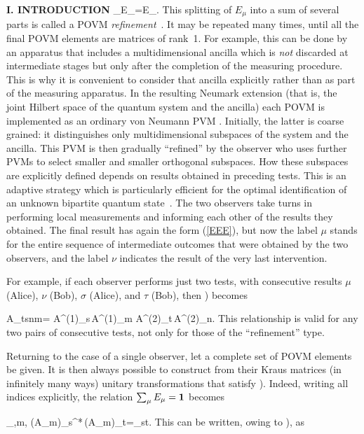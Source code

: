 \begin{center}{\bf I. INTRODUCTION}
\beq \sum_\nu E_{\nu\mu}=E_\mu. \eeq
This splitting of $E_\mu$ into a sum of several parts is called a POVM
{\it refinement\/}~\cite{PW91}. It may be repeated many times, until all
the final POVM elements are matrices of rank~1. For example, this can be
done by an apparatus that includes a multidimensional ancilla which is
{\it not\/} discarded at intermediate stages but only after the
completion of the measuring procedure. This is why it is convenient to
consider that ancilla explicitly rather than as part of the measuring
apparatus. In the resulting Neumark extension (that is, the joint
Hilbert space of the quantum system and the ancilla) each POVM is
implemented as an ordinary von Neumann PVM \cite{Hel,Neu}. Initially,
the latter is coarse grained: it distinguishes only multidimensional
subspaces of the system and the ancilla. This PVM is then gradually
``refined'' by the observer who uses further PVMs to select smaller and
smaller orthogonal subspaces. How these subspaces are explicitly defined
depends on results obtained in preceding tests. This is an adaptive
strategy which is particularly efficient for the optimal identification
of an unknown bipartite quantum state~\cite{PW91}. The two observers
take turns in performing local measurements and informing each other of
the results they obtained. The final result has again the form
(\ref{EEE}), but now the label $\mu$ stands for the entire sequence of
intermediate outcomes that were obtained by the two observers, and the
label $\nu$ indicates the result of the very last intervention.

For example, if each observer performs just two tests, with consecutive
results $\mu$ (Alice), $\nu$ (Bob), $\sigma$ (Alice), and $\tau$ (Bob),
then ) becomes

\beq A_{\tau\sigma\nu\mu tsnm}=
 A^{(1)}_{\nu\mu\sigma s}\,A^{(1)}_{\mu m}\0
 A^{(2)}_{\tau\sigma\nu\mu t}\,A^{(2)}_{\nu\mu n}.\eeq
This relationship is valid for any two pairs of consecutive tests, not
only for those of the ``refinement'' type.

Returning to the case of a single observer, let a complete set of POVM
elements be given. It is then always possible to construct from their
Kraus matrices (in infinitely many ways) unitary transformations that
satisfy ). Indeed, writing all indices explicitly, the
relation $\sum_\mu E_\mu={\bf1}$ becomes

\beq \sum_{\mu,m,\sigma}
  (A_{\mu m})_{\sigma s}^*\,(A_{\mu m})_{\sigma t}=\delta_{st}.\eeq
This can be written, owing to ), as


\end{center}
